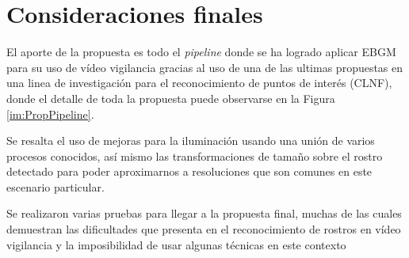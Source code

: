 \section{Consideraciones finales}
El aporte de la propuesta es todo el \textit{pipeline} donde se ha logrado aplicar \ac{EBGM} para su uso de vídeo vigilancia gracias al uso de una de las ultimas propuestas en una linea de investigación para el reconocimiento de puntos de interés (\ac{CLNF}), donde el detalle de toda la propuesta puede observarse en la Figura \ref{im:PropPipeline}. 

Se resalta el uso de mejoras para la iluminación usando una unión de varios procesos conocidos, así mismo las transformaciones de tamaño sobre el rostro detectado para poder aproximarnos a resoluciones que son comunes en este escenario particular.

Se realizaron varias pruebas para llegar a la propuesta final, muchas de las cuales demuestran las dificultades que presenta en el reconocimiento de rostros en vídeo vigilancia y la imposibilidad de usar algunas técnicas en este contexto
